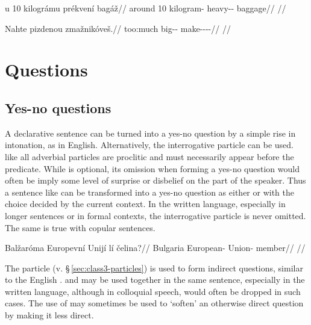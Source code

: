 \ex
\begingl
\gla u 10 kilográmu prékvení bagáž//
\glb around 10 kilogram-\Ins{} heavy-\Comp{}-\Att{} baggage//
\glft {}//
\endgl
\xe

\ex
\begingl
\gla Nahte pizdenou zmažnikóveš.//
\glb too:much big-\Comp{}-\Nz{} make-\Pv{}-\Pf{}-\Nz{}-\Second{}\Sg{}//
\glft {}//
\endgl
\xe

\section{Questions}\label{sec:questions-syntax}

\subsection{Yes-no questions}\label{sec:questions-yesno}

A declarative sentence can be turned into a yes-no question by a simple rise in
intonation, as in English. Alternatively, the interrogative particle 
can be used.  like all adverbial particles are proclitic and must
necessarily appear before the predicate. While  is optional, its
omission when forming a yes-no question would often be imply some level of
surprise or disbelief on the part of the speaker. Thus a sentence like
 can be transformed into a yes-no
question as either  or  with the choice decided by the current
context. In the written language, especially in longer sentences or in formal
contexts, the interrogative particle is never omitted. The same is true with
copular sentences.

\pex
\begingl
  \gla Balžaróma Europevní Unijí lí čelina?//
  \glb Bulgaria European-\Att{} Union-\Gen{} \Q{} member//
  \glft {}//
\endgl
\xe

The particle  (v. \S\,\ref{sec:class3-particles}) is used to form
indirect questions, similar to the English .  and
 may be used together in the same sentence, especially in the written
language, although in colloquial speech,  would often be dropped in such
cases. The use of  may sometimes be used to `soften' an otherwise
direct question by making it less direct.

